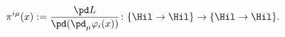 \begin{equation}	\label{2.8}
\pi^{i\mu}(x) := \frac{\pd L}{\pd(\pd_\mu\varphi_i(x))}
\colon
\{\Hil\to\Hil\} \to \{\Hil\to\Hil\} .
	\end{equation}

